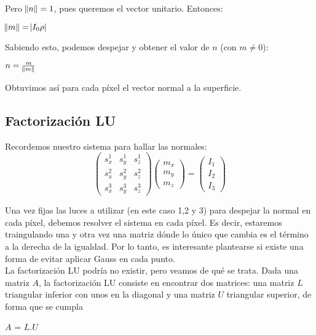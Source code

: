 Pero $\norm{n} = 1$, pues queremos el vector unitario. Entonces:

\begin{center}
$\norm{m} = \abs{I_0 \rho}$
\end{center}

Sabiendo esto, podemos despejar y obtener el valor de $n$ (con $m \neq 0$):

\begin{center}
$n = \frac{m}{\norm{m}}$
\end{center}

Obtuvimos así para cada píxel el vector normal a la superficie.

\subsection{Factorización LU}

Recordemos nuestro sistema para hallar las normales:
\[
\begin{pmatrix}
    s_{x}^{1} & s_{y}^{1} & s_{z}^{1} \\
    s_{x}^{2} & s_{y}^{2} & s_{z}^{2} \\
    s_{x}^{3} & s_{y}^{3} & s_{z}^{3}
\end{pmatrix}
\begin{pmatrix}
    m_{x} \\
    m_{y} \\
    m_{z}
\end{pmatrix}
=
\begin{pmatrix}
    I_{1} \\
    I_{2} \\
    I_{3}
\end{pmatrix}
\]

Una vez fijas las luces a utilizar (en este caso 1,2 y 3) para despejar la normal en cada píxel, debemos resolver el sistema en cada píxel. Es decir, estaremos traingulando una y otra vez una matriz dónde lo único que cambia es el término a la derecha de la igualdad. Por lo tanto, es interesante plantearse si existe una forma de evitar aplicar Gauss en cada punto. \\

La factorización LU podría no existir, pero veamos de qué se trata. Dada una matriz $A$, la factorización LU consiste en encontrar dos matrices: una matriz $L$ triangular inferior con unos en la diagonal y una matriz $U$ triangular superior, de forma que se cumpla

\begin{center}
$A$ = $L$.$U$
\end{center}

